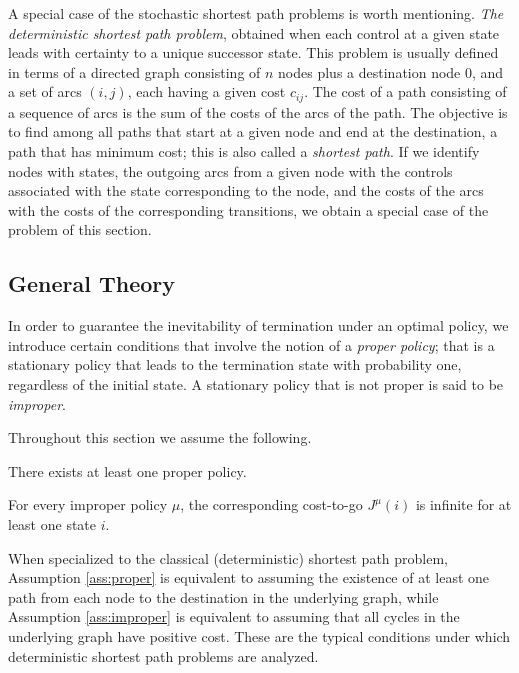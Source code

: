 A special case of the stochastic shortest path problems is worth mentioning. \emph{The deterministic shortest path problem}, obtained when each control at a given state leads with certainty to a unique successor state. This problem is usually defined in terms of a directed graph consisting of $n$ nodes plus a destination node 0, and a set of arcs $(i,j)$, each having a given cost $c_{ij}$. The cost of a path consisting of a sequence of arcs is the sum of the costs of the arcs of the path. The objective is to find among all paths that start at a given node and end at the destination, a path that has minimum cost; this is also called a \emph{shortest path}. If we identify nodes with states, the outgoing arcs from a given node with the controls associated with the state corresponding to the node, and the costs of the arcs with the costs of the corresponding transitions, we obtain a special case of the problem of this section.

\subsection{General Theory} \label{sec:generaltheory}
In order to guarantee the inevitability of termination under an optimal policy, we introduce certain conditions that involve the notion of a \emph{proper policy}; that is a stationary policy that leads to the termination state with probability one, regardless of the initial state. A stationary policy that is not proper is said to be \emph{improper}.

Throughout this section we assume the following.
\begin{assumption} \label{ass:proper}
There exists at least one proper policy.
\end{assumption}
\begin{assumption} \label{ass:improper}
For every improper policy $\mu$, the corresponding cost-to-go $J^\mu(i)$ is infinite for at least one state $i$.
\end{assumption}

When specialized to the classical (deterministic) shortest path problem, Assumption \ref{ass:proper} is equivalent to assuming the existence of at least one path from each node to the destination in the underlying graph, while Assumption \ref{ass:improper} is equivalent to assuming that all cycles in the underlying graph have positive cost. These are the typical conditions under which deterministic shortest path problems are analyzed.


